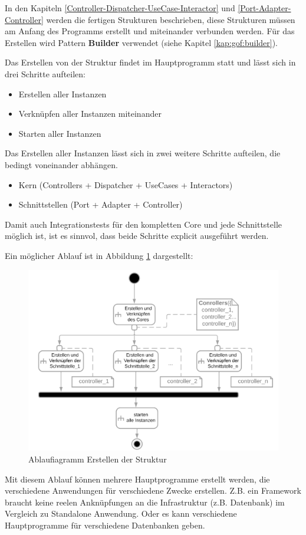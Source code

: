 In den Kapiteln \ref{Controller-Dispatcher-UseCase-Interactor} und \ref{Port-Adapter-Controller} 
werden die fertigen Strukturen beschrieben, diese Strukturen müssen am Anfang des Programms erstellt
und miteinander verbunden werden. Für das Erstellen wird Pattern \textbf{Builder} verwendet (siehe Kapitel \ref{kap:gof:builder}).

Das Erstellen von der Struktur findet im Hauptprogramm statt und lässt sich in drei Schritte aufteilen:
\begin{itemize}
    \item Erstellen aller Instanzen
    \item Verknüpfen aller Instanzen miteinander
    \item Starten aller Instanzen
\end{itemize}

Das Erstellen aller Instanzen lässt sich in zwei weitere Schritte aufteilen, die bedingt voneinander abhängen.
\begin{itemize}
    \item Kern (Controllers + Dispatcher + UseCases + Interactors)
    \item Schnittstellen (Port + Adapter + Controller)
\end{itemize}

Damit auch Integrationstests für den kompletten Core und jede Schnittstelle möglich ist, ist es sinnvol, dass beide Schritte
explicit ausgeführt werden.

Ein möglicher Ablauf ist in Abbildung \ref{fig:ADCreate} dargestellt:
\begin{figure}[H]
    \centering
    \includegraphics[width=12cm]{./images/Erstellen AD.png}
     \caption[Ablaufiagramm Erstellen der Struktur]{Ablaufiagramm Erstellen der Struktur}
     \label{fig:ADCreate}
\end{figure}

Mit diesem Ablauf können mehrere Hauptprogramme erstellt werden, die verschiedene Anwendungen für verschiedene Zwecke erstellen.
Z.B. ein Framework braucht keine reelen Anknüpfungen an die Infrastruktur (z.B. Datenbank) im Vergleich zu Standalone Anwendung.
Oder es kann verschiedene Hauptprogramme für verschiedene Datenbanken geben.
